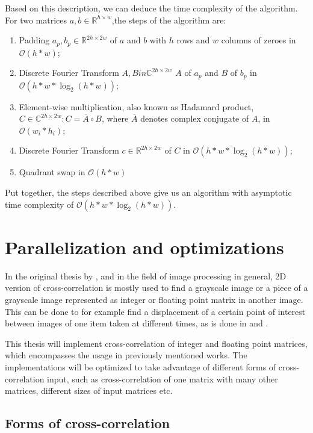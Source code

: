 Based on this description, we can deduce the time complexity of the algorithm. For two matrices $a,b \in \mathbb{R}^{h \times w}$,the steps of the algorithm are:
\begin{enumerate}
	\item Padding $a_p, b_p \in \mathbb{R}^{2h \times 2w}$ of $a$ and $b$ with $h$ rows and $w$ columns of zeroes in $\mathcal{O}(h*w)$;
	\item Discrete Fourier Transform $A,B 
	in \mathbb{C}^{2h \times 2w}$ $A$ of $a_p$ and $B$ of $b_p$ in $\mathcal{O}(h*w*\log_2(h*w))$;
	\item Element-wise multiplication, also known as Hadamard product, $C \in \mathbb{C}^{2h \times 2w}: C = \overline{A} \circ B$, where $\overline{A}$ denotes complex conjugate of $A$, in $\mathcal{O}(w_i*h_i)$;
	\item Discrete Fourier Transform $c \in \mathbb{R}^{2h \times 2w}$ of $C$ in $\mathcal{O}(h*w*\log_2(h*w))$;
	\item Quadrant swap in $\mathcal{O}(h*w)$
\end{enumerate}

Put together, the steps described above give us an algorithm with asymptotic time complexity of $\mathcal{O}(h*w*\log_2(h*w))$.

\section{Parallelization and optimizations}
In the original thesis by \citep{misko}, and in the field of image processing in general, 2D version of cross-correlation is mostly used to find a grayscale image or a piece of a grayscale image represented as integer or floating point matrix in another image. This can be done to for example find a displacement of a certain point of interest between images of one item taken at different times, as is done in \citet{misko} and \citet{zhang2015}. 

This thesis will implement cross-correlation of integer and floating point matrices, which encompasses the usage in previously mentioned works. The implementations will be optimized to take advantage of different forms of cross-correlation input, such as cross-correlation of one matrix with many other matrices, different sizes of input matrices etc. 

\subsection{Forms of cross-correlation}

